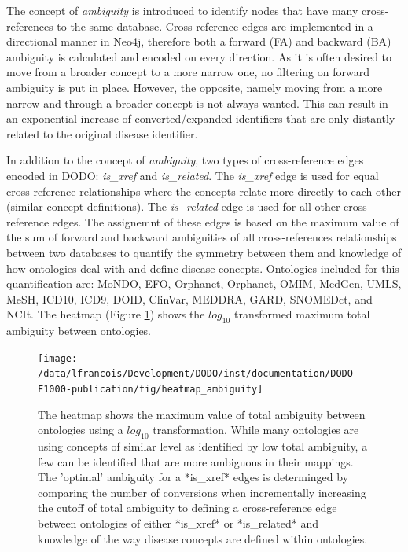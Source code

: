 \documentclass[9pt,a4paper,]{extarticle}
\begin{document}
The concept of \emph{ambiguity} is introduced to identify nodes that have many cross-references to the same database. Cross-reference edges are implemented in a directional manner in Neo4j, therefore both a forward (FA) and backward (BA) ambiguity is calculated and encoded on every direction. As it is often desired to move from a broader concept to a more narrow one, no filtering on forward ambiguity is put in place. However, the opposite, namely moving from a more narrow and through a broader concept is not always wanted. This can result in an exponential increase of converted/expanded identifiers that are only distantly related to the original disease identifier.

In addition to the concept of \emph{ambiguity}, two types of cross-reference edges encoded in DODO: \emph{is\_xref} and \emph{is\_related}. The \emph{is\_xref} edge is used for equal cross-reference relationships where the concepts relate more directly to each other (similar concept definitions). The \emph{is\_related} edge is used for all other cross-reference edges. The assignemnt of these edges is based on the maximum value of the sum of forward and backward ambiguities of all cross-references relationships between two databases to quantify the symmetry between them and knowledge of how ontologies deal with and define disease concepts. Ontologies included for this quantification are: MoNDO, EFO, Orphanet, Orphanet, OMIM, MedGen, UMLS, MeSH, ICD10, ICD9, DOID, ClinVar, MEDDRA, GARD, SNOMEDct, and NCIt. The heatmap (Figure \ref{fig:heatmapAmbiguity}) shows the \(log_{10}\) transformed maximum total ambiguity between ontologies.

\begin{figure}

{\centering \texttt{[image: /data/lfrancois/Development/DODO/inst/documentation/DODO-F1000-publication/fig/heatmap\_ambiguity]} 

}

\caption{The heatmap shows the maximum value of total ambiguity between ontologies using a $log_{10}$ transformation. While many ontologies are using concepts of similar level as identified by low total ambiguity, a few can be identified that are more ambiguous in their mappings. The 'optimal' ambiguity for a *is\_xref* edges is determinged by comparing the number of conversions when incrementally increasing the cutoff of total ambiguity to defining a cross-reference edge between ontologies of either *is\_xref* or *is\_related* and knowledge of the way disease concepts are defined within ontologies.}\label{fig:heatmapAmbiguity}
\end{figure}
\end{document}
